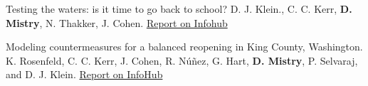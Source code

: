 \begin{cventries}

  \cvpublicationentrytwo
    {Testing the waters: is it time to go back to school?} %
    {D. J. Klein., C. C. Kerr, \textbf{D. Mistry}, N. Thakker, J. Cohen.} %
    {} %
    {} %
    {} %
    {} %
    {} %
    {\hspace{-4mm}} %
    {\href{https://covid.idmod.org/data/Testing_the_waters_time_to_go_back_to_school.pdf}{Report on Infohub \faLink\acvHeaderIconSep}  } %
    \vspace{1.5mm}



  \cvpublicationentrytwo
    {Modeling countermeasures for a balanced reopening in King County, Washington.} %
    {K. Rosenfeld, C. C. Kerr, J. Cohen, R. N\'{u}\~{n}ez, G. Hart, \textbf{D. Mistry}, P. Selvaraj, and D. J. Klein.} %
    {} %
    {} %
    {} %
    {} %
    {} %
    {\hspace{-6mm}} %
    {\href{https://covid.idmod.org/data/Modeling_countermeasures_for_balanced_reopening_King_County_Washington.pdf}{Report on InfoHub \faLink\acvHeaderIconSep}
    } %
    \vspace{1.5mm}


\end{cventries}
